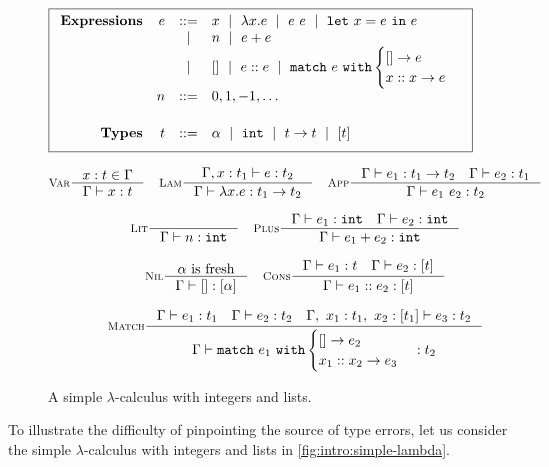 \begin{figure}[t]
\centering
\[
\boxed{
\begin{array}{rrcl}
\mathbf{Expressions}
& e & ::=    & x \spmid \efun{x}{e} \spmid \eapp{e}{e} \spmid \elet{x}{e}{e} \\
&   & \spmid & n \spmid \eplus{e}{e}\\
&   & \spmid & \enil \spmid \econs{e}{e} \spmid \elcase{e}{e}{x}{x}{e} \\[0.05in]

& n & ::= &  0, 1, -1, \ldots \\[0.2in]

\mathbf{Types}
& t & ::= & \alpha \spmid %
            \tint \spmid \tarr{t}{t} \spmid %
            \tlist{t} \\[0.05in]
\end{array}
}
\]
\begin{framed}
\begin{gather*}
\inference[\textsc{Var}]
  {x:t \in \Gamma}
  {\jtype{\Gamma}{x}{t}}
\quad
\inference[\textsc{Lam}]
  {\jtype{\Gamma, x:t_1}{e}{t_2}}
  {\jtype{\Gamma}{\efun{x}{e}}{\tarr{t_1}{t_2}}}
\quad
\inference[\textsc{App}]
  {\jtype{\Gamma}{e_1}{\tarr{t_1}{t_2}}
   \quad
   \jtype{\Gamma}{e_2}{t_1}}
  {\jtype{\Gamma}{\eapp{e_1}{e_2}}{t_2}}
\\[0.1in]
\inference[\textsc{Lit}]
  {}
  {\jtype{\Gamma}{n}{\tint}}
\quad
\inference[\textsc{Plus}]
  {\jtype{\Gamma}{e_1}{\tint} \quad \jtype{\Gamma}{e_2}{\tint}}
  {\jtype{\Gamma}{\eplus{e_1}{e_2}}{\tint}}
\\[0.1in]
\inference[\textsc{Nil}]
  {\alpha \text{ is fresh}}
  {\jtype{\Gamma}{\enil}{\tlist{\alpha}}}
\quad
\inference[\textsc{Cons}]
  {\jtype{\Gamma}{e_1}{t} \quad \jtype{\Gamma}{e_2}{\tlist{t}}}
  {\jtype{\Gamma}{\econs{e_1}{e_2}}{\tlist{t}}}
\\[0.1in]
\inference[\textsc{Match}]
  {\jtype{\Gamma}{e_1}{t_1}
    \quad
   \jtype{\Gamma}{e_2}{t_2}
    \quad
   \jtype{\Gamma,\ x_1:t_1,\ x_2:\tlist{t_1}}{e_3}{t_2}
  }
  {\jtype{\Gamma}{\elcase{e_1}{e_2}{x_1}{x_2}{e_3}}{t_2}}
\end{gather*}
\end{framed}
\caption{A simple $\lambda$-calculus with integers and lists.}
\label{fig:intro:simple-lambda}
\end{figure}

To illustrate the difficulty of pinpointing the source of type errors,
let us consider the simple $\lambda$-calculus with integers and lists in
\autoref{fig:intro:simple-lambda}.
